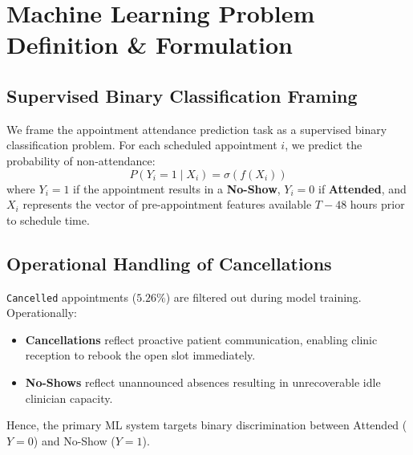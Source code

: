 \documentclass[11pt,a4paper]{article}
\begin{document}
\section{Machine Learning Problem Definition \& Formulation}
\subsection{Supervised Binary Classification Framing}
We frame the appointment attendance prediction task as a supervised binary classification problem. For each scheduled appointment $i$, we predict the probability of non-attendance:
\begin{equation}
P(Y_i = 1 \mid X_i) = \sigma(f(X_i))
\end{equation}
where $Y_i = 1$ if the appointment results in a \textbf{No-Show}, $Y_i = 0$ if \textbf{Attended}, and $X_i$ represents the vector of pre-appointment features available $T-48$ hours prior to schedule time.

\subsection{Operational Handling of Cancellations}
\texttt{Cancelled} appointments ($5.26\%$) are filtered out during model training. Operationally:
\begin{itemize}
    \item \textbf{Cancellations} reflect proactive patient communication, enabling clinic reception to rebook the open slot immediately.
    \item \textbf{No-Shows} reflect unannounced absences resulting in unrecoverable idle clinician capacity.
\end{itemize}
Hence, the primary ML system targets binary discrimination between Attended ($Y=0$) and No-Show ($Y=1$).
\end{document}
